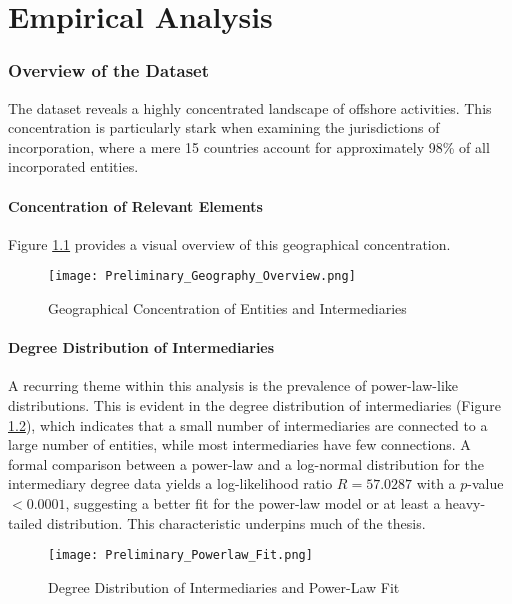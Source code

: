 \chapter{Empirical Analysis}
\label{chap:empirical_analysis}

\subsection{Overview of the Dataset}
The dataset reveals a highly concentrated landscape of offshore activities. This concentration is particularly stark when examining the jurisdictions of incorporation, where a mere 15 countries account for approximately 98\% of all incorporated entities.

\subsubsection{Concentration of Relevant Elements}
Figure \ref{fig:preliminary_geography_overview} provides a visual overview of this geographical concentration.
\begin{figure}[htbp]
    \centering
    \texttt{[image: Preliminary\_Geography\_Overview.png]}
    \caption{Geographical Concentration of Entities and Intermediaries}
    \label{fig:preliminary_geography_overview}
\end{figure}

\subsubsection{Degree Distribution of Intermediaries}
A recurring theme within this analysis is the prevalence of power-law-like distributions. This is evident in the degree distribution of intermediaries (Figure \ref{fig:preliminary_powerlaw_fit}), which indicates that a small number of intermediaries are connected to a large number of entities, while most intermediaries have few connections. A formal comparison between a power-law and a log-normal distribution for the intermediary degree data yields a log-likelihood ratio $R = 57.0287$ with a $p$-value $< 0.0001$, suggesting a better fit for the power-law model or at least a heavy-tailed distribution. This characteristic underpins much of the thesis.

\begin{figure}[htbp]
    \centering
    \texttt{[image: Preliminary\_Powerlaw\_Fit.png]}
    \caption{Degree Distribution of Intermediaries and Power-Law Fit}
    \label{fig:preliminary_powerlaw_fit}
\end{figure}

